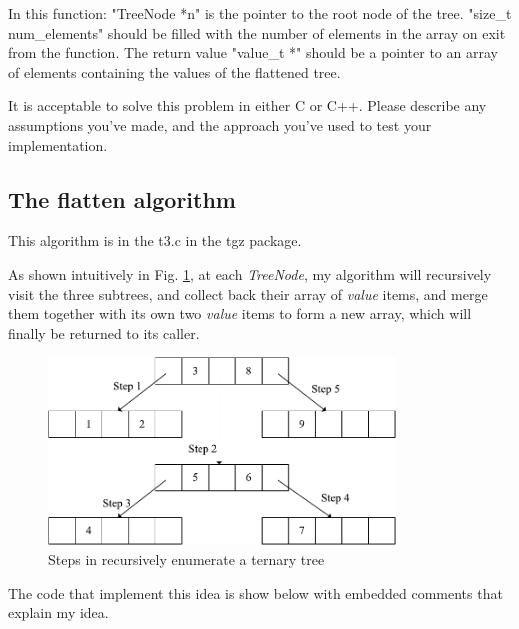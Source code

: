 \documentclass[runningheads,a4paper]{llncs}
\begin{document}
In this function:
"TreeNode *n" is the pointer to the root node of the tree.
"size\_t \*num\_elements" should be filled with the number of elements in
the array on exit from the function.
The return value "value\_t *" should be a pointer to an array of elements
containing the values of the flattened tree.

It is acceptable to solve this problem in either C or C++.
Please describe any assumptions you've made, and the approach you've
used to test your implementation.


\subsection{The flatten algorithm}

This algorithm is in the t3.c in the tgz package.

As shown intuitively in Fig. \ref{fig_flatten},
at each \emph{TreeNode},
my algorithm will recursively visit the three subtrees,
and collect back their array of \emph{value} items,
and merge them together with its own two \emph{value} items to form a new array,
which will finally be returned to its caller.

\begin{figure}
\centering
\includegraphics[width=9.2cm]{fig_flatten}
\caption{Steps in recursively enumerate a ternary tree}
\label{fig_flatten}
\end{figure}


The code that implement this idea is show below with embedded comments that explain my idea.
\end{document}
